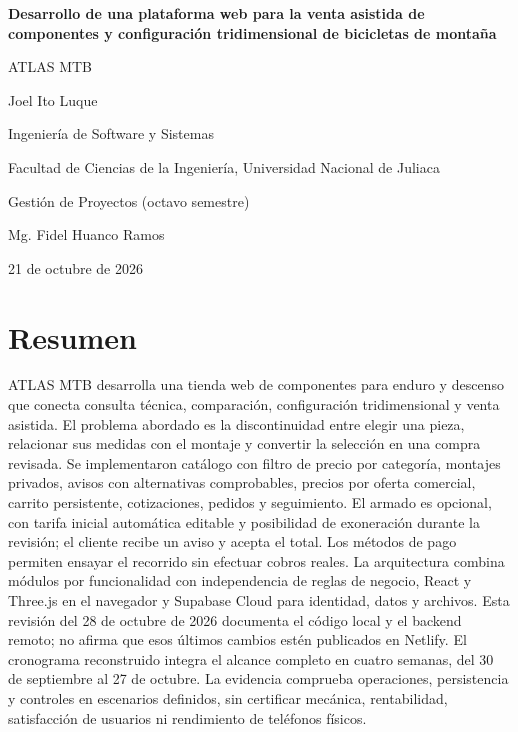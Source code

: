 \documentclass[12pt,letterpaper]{article}
\begin{document}
\begin{titlepage}
\thispagestyle{fancy}
\centering
\vspace*{3\baselineskip}
{\normalsize\bfseries Desarrollo de una plataforma web para la venta asistida de componentes y configuración tridimensional de bicicletas de montaña\par
ATLAS MTB\par}
\vspace{\baselineskip}
Joel Ito Luque\par
Ingeniería de Software y Sistemas\par
Facultad de Ciencias de la Ingeniería, Universidad Nacional de Juliaca\par
Gestión de Proyectos (octavo semestre)\par
Mg. Fidel Huanco Ramos\par
21 de octubre de 2026\par
\end{titlepage}
\setcounter{page}{2}

\section*{Resumen}
\noindent ATLAS MTB desarrolla una tienda web de componentes para enduro y descenso que conecta consulta técnica, comparación, configuración tridimensional y venta asistida. El problema abordado es la discontinuidad entre elegir una pieza, relacionar sus medidas con el montaje y convertir la selección en una compra revisada. Se implementaron catálogo con filtro de precio por categoría, montajes privados, avisos con alternativas comprobables, precios por oferta comercial, carrito persistente, cotizaciones, pedidos y seguimiento. El armado es opcional, con tarifa inicial automática editable y posibilidad de exoneración durante la revisión; el cliente recibe un aviso y acepta el total. Los métodos de pago permiten ensayar el recorrido sin efectuar cobros reales. La arquitectura combina módulos por funcionalidad con independencia de reglas de negocio, React y Three.js en el navegador y Supabase Cloud para identidad, datos y archivos. Esta revisión del 28 de octubre de 2026 documenta el código local y el backend remoto; no afirma que esos últimos cambios estén publicados en Netlify. El cronograma reconstruido integra el alcance completo en cuatro semanas, del 30 de septiembre al 27 de octubre. La evidencia comprueba operaciones, persistencia y controles en escenarios definidos, sin certificar mecánica, rentabilidad, satisfacción de usuarios ni rendimiento de teléfonos físicos.
\end{document}
